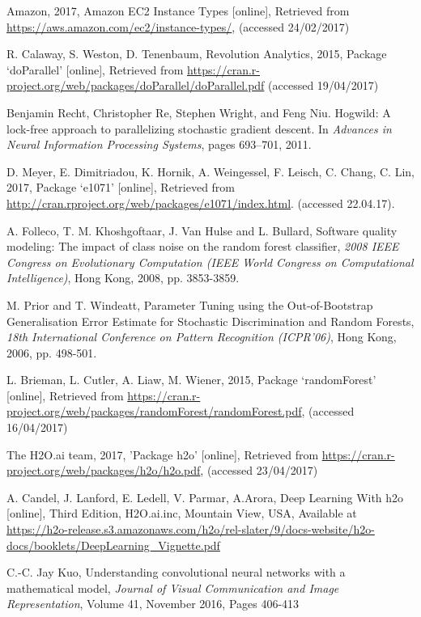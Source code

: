 \documentclass[journal]{IEEEtran}
\begin{document}
\begin{thebibliography}{30}
Amazon, 
2017,
 Amazon EC2 Instance Types [online], 
Retrieved from \url{ https://aws.amazon.com/ec2/instance-types/}, 
(accessed 24/02/2017)

R. Calaway, S. Weston, D. Tenenbaum, Revolution Analytics, 2015, Package ‘doParallel’ [online], Retrieved from \url{ https://cran.r-project.org/web/packages/doParallel/doParallel.pdf}  (accessed 19/04/2017)

Benjamin Recht, Christopher Re, Stephen Wright, and
Feng Niu. Hogwild: A lock-free approach to parallelizing
stochastic gradient descent. In \emph{Advances in
Neural Information Processing Systems}, pages 693–701,
2011.

D. Meyer, E. Dimitriadou, K. Hornik, A. Weingessel, F. Leisch, C. Chang, C. Lin,  2017, Package ‘e1071’ [online], Retrieved from \url{http://cran.rproject.org/web/packages/e1071/index.html}. (accessed 22.04.17).

A. Folleco, T. M. Khoshgoftaar, J. Van Hulse and L. Bullard, Software quality modeling: The impact of class noise on the random forest classifier, \emph{2008 IEEE Congress on Evolutionary Computation (IEEE World Congress on Computational Intelligence)}, Hong Kong, 2008, pp. 3853-3859.

M. Prior and T. Windeatt, Parameter Tuning using the Out-of-Bootstrap Generalisation Error Estimate for Stochastic Discrimination and Random Forests, \emph{18th International Conference on Pattern Recognition (ICPR'06)}, Hong Kong, 2006, pp. 498-501.

L. Brieman, L. Cutler, A. Liaw, M. Wiener, 2015, Package ‘randomForest’ [online], Retrieved from \url{ https://cran.r-project.org/web/packages/randomForest/randomForest.pdf}, (accessed 16/04/2017)

The H2O.ai team, 2017, 'Package h2o' [online], Retrieved from \url{https://cran.r-project.org/web/packages/h2o/h2o.pdf},
(accessed 23/04/2017)

A. Candel, J. Lanford, E. Ledell, V. Parmar, A.Arora, Deep Learning With h2o [online], Third Edition, H2O.ai.inc, Mountain View, USA,  Available at \url{https://h2o-release.s3.amazonaws.com/h2o/rel-slater/9/docs-website/h2o-docs/booklets/DeepLearning_Vignette.pdf}

C.-C. Jay Kuo, Understanding convolutional neural networks with a mathematical model, \emph{Journal of Visual Communication and Image Representation}, Volume 41, November 2016, Pages 406-413


\end{thebibliography}
\end{document}
